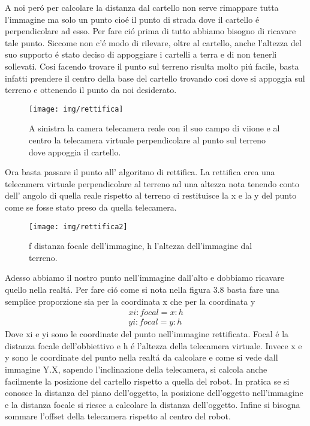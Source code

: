 		A noi per\'o per calcolare la distanza dal cartello non serve rimappare tutta l'immagine ma solo un punto cio\'e il punto di strada dove il cartello \'e perpendicolare ad esso. Per fare ci\'o prima di tutto abbiamo bisogno di ricavare tale punto. Siccome non c'\'e modo di rilevare, oltre al cartello, anche l'altezza del suo supporto \'e stato deciso di appoggiare i cartelli a terra e di non tenerli sollevati. Cosi facendo trovare il punto sul terreno risulta molto pi\'u facile, basta infatti prendere il centro della base del cartello trovando cosi dove si appoggia sul terreno e ottenendo il punto da noi desiderato.
		\begin{figure}[!ht]
			\centering
			\texttt{[image: img/rettifica]}
			\caption{A sinistra la camera telecamera reale con il suo campo di viione e al centro la telecamera virtuale perpendicolare al punto sul terreno dove appoggia il cartello.}
		\end{figure}
		Ora basta passare il punto all' algoritmo di rettifica. La rettifica crea una telecamera virtuale perpendicolare al terreno ad una altezza nota tenendo conto dell' angolo di quella reale  rispetto al terreno ci restituisce la x e la y del punto come se fosse stato preso da quella telecamera.

		\begin{figure}[!ht]
			\centering
			\texttt{[image: img/rettifica2]}
			\caption{f distanza focale dell'immagine, h l'altezza dell'immagine dal terreno.}
		\end{figure}
		Adesso abbiamo il nostro punto nell'immagine dall'alto e dobbiamo ricavare quello nella realt\'a. Per fare ci\'o come si nota nella figura 3.8 basta fare una semplice proporzione sia per la coordinata x che per la coordinata y
		\begin{align*}
			xi : focal = x : h
			\\
			yi : focal = y : h
		\end{align*}
		Dove xi e yi sono le coordinate del punto nell'immagine rettificata. Focal \'e la distanza focale dell'obbiettivo e h \'e l'altezza della telecamera virtuale. Invece x e y sono le coordinate del punto nella realt\'a da calcolare e come si vede dall immagine Y.X, sapendo l'inclinazione della telecamera, si calcola anche facilmente la posizione del cartello rispetto a quella del robot.
		In pratica se si conosce la distanza del piano dell'oggetto, la posizione dell'oggetto nell'immagine e la distanza focale si riesce a calcolare la distanza dell'oggetto. Infine si bisogna sommare l'offset della telecamera rispetto al centro del robot.

